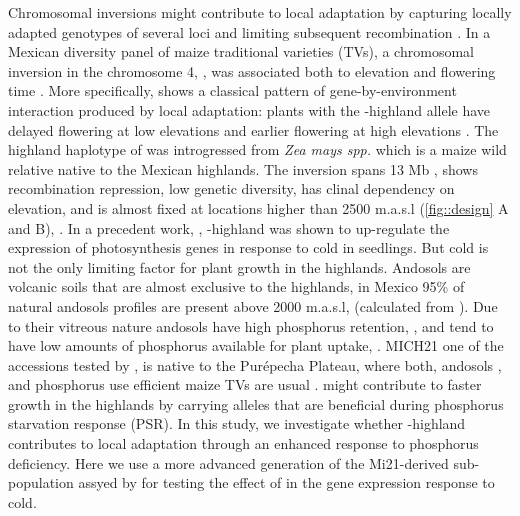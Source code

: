 Chromosomal inversions might contribute to local adaptation by capturing locally adapted genotypes of several loci and limiting subsequent recombination \citep{kirkpatrick2006b}. 
In a Mexican diversity panel of maize traditional varieties (TVs), a chromosomal inversion in the chromosome 4, \invfour, was associated both to elevation and flowering time \citep{romero_navarro2017-cn}. 
More specifically, \invfour shows a classical pattern of gene-by-environment interaction produced by local adaptation: plants with the \invfour-highland allele have delayed flowering at low elevations and earlier flowering at high elevations \citep{crow2020}. 
The highland haplotype of \invfour was introgressed from \textit{Zea mays spp.} \mex \citep{calfee2021-mr,gonzalez-segovia2019-jy,hufford2013-gs} which is a maize wild relative native to the Mexican highlands. 
The \invfour inversion spans 13 Mb \citep{pyhajarvi2013, calfee2021-mr}, shows recombination repression, low genetic diversity, has clinal dependency on elevation, and is almost fixed at locations higher than 2500 m.a.s.l (\autoref{fig::design} A and B), \citep{crow2020,gonzalez-segovia2019-jy}. 
In a precedent work, \citep{crow2020}, \invfour-highland was shown to up-regulate the expression of photosynthesis genes in response to cold in seedlings. 
But cold is not the only limiting factor for plant growth in the highlands.
Andosols are volcanic soils that are almost exclusive to the highlands, in Mexico 95\% of natural andosols profiles are present above 2000 m.a.s.l, (calculated from \cite{paz-pellat2018,inegi2013}). 
Due to their vitreous nature andosols have high phosphorus retention, \citep{krasilnikov2013}, and tend to have low amounts of phosphorus available for plant uptake, \citep{galvan-tejada2014}.
MICH21 one of the accessions tested by \citep{crow2020}, is native to the Purépecha Plateau, where both, andosols \citep{paz-pellat2018,inegi2013,galvan-tejada2014}, and phosphorus use efficient maize TVs are usual \citep{bayuelo-jimenez2011, bayuelo-jimenez2014}. 
\invfour might contribute to faster growth in the highlands by carrying alleles that are beneficial during phosphorus starvation response (PSR).
In this study, we investigate whether \invfour-highland contributes to local adaptation through an enhanced response to phosphorus deficiency.
Here we use a more advanced generation of the Mi21-derived sub-population assyed by \citep{crow2020} for testing the effect of \invfour in the gene expression response to cold.

